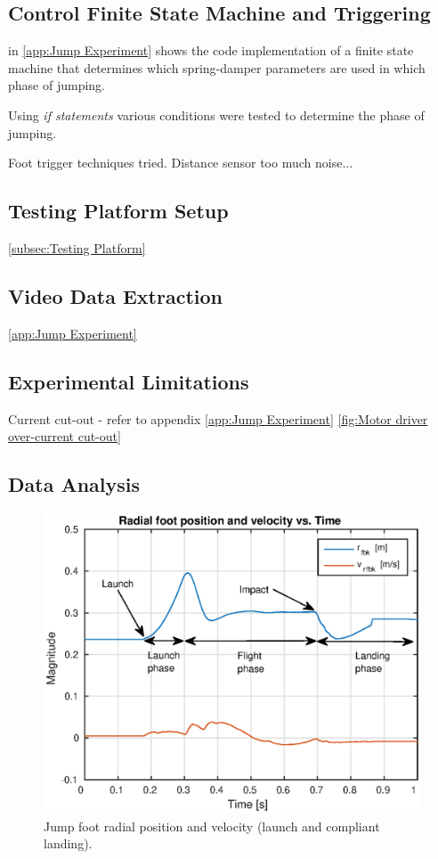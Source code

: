 \subsection{Control Finite State Machine and Triggering}

 in \cref{app:Jump Experiment} shows the code implementation of a finite state machine that determines which spring-damper parameters are used in which phase of jumping. 

Using \textit{if statements} various conditions were tested to determine the phase of jumping.

Foot trigger techniques tried. Distance sensor too much noise...

\subsection{Testing Platform Setup}

\cref{subsec:Testing Platform}

\subsection{Video Data Extraction}

\cref{app:Jump Experiment}

\subsection{Experimental Limitations}

Current cut-out - refer to appendix \cref{app:Jump Experiment} \cref{fig:Motor driver over-current cut-out}

\subsection{Data Analysis}

\begin{figure}
\centering
\includegraphics[width=1\textwidth]{images/experiments/jump/jump-foot-position-velocity.eps} 
\caption{Jump foot radial position and velocity (launch and compliant landing).}
\label{fig:Jump foot radial position and velocity}
\end{figure}

